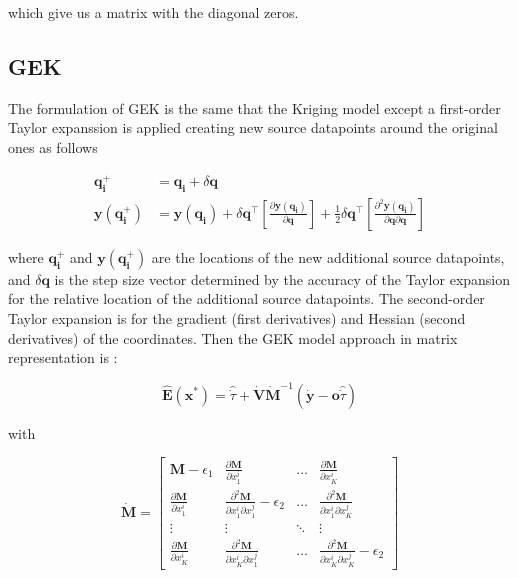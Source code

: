 \documentclass[aps,prb,twocolumn,superscriptaddress,floatfix,longbibliography,10pt]{revtex4-2}
\begin{document}
which give us a matrix with the diagonal zeros. 

\subsection{GEK}

The formulation of GEK is the same that the Kriging model except a first-order Taylor expanssion is applied creating new source datapoints around the original ones as follows\cite{Yamazaki2012}

\begin{equation} \label{eqn:xynewdata}
\begin{aligned}
\mathbf{q_i^+} &= \mathbf{q_i}+\delta\mathbf{q} \\
\mathbf{y(q_i^+)} &= \mathbf{y(q_i)}+\delta\mathbf{q}^\intercal\left[\frac{\partial \mathbf{y(q_i)}}{\partial \mathbf{q}}\right] + \frac{1}{2}\delta\mathbf{q}^\intercal\left[\frac{\partial^2 \mathbf{y(q_i)}}{\partial \mathbf{q}\partial \mathbf{q}}\right]
\end{aligned}
\end{equation}

where $\mathbf{q_i^+}$ and $\mathbf{y(q_i^+)}$ are the locations of the new additional source datapoints, and $\delta\mathbf{q}$ is the step size vector determined by the accuracy of the Taylor expansion for the relative location of the additional source datapoints. The second-order Taylor expansion is for the gradient (first derivatives) and Hessian (second derivatives) of the coordinates. Then the GEK model approach in matrix representation is :

\begin{equation} \label{eqn:GEK}
\mathbf{\hat{E}}(\mathbf{x}^*) =  \hat{\dot \tau} + \mathbf{\dot V} \mathbf{\dot M}^{-1}(\mathbf{\dot y} - \mathbf{o}\hat{\dot \tau})
\end{equation}

with 

\begin{equation} \label{eqn:dotM}
\mathbf{\dot M} = 
\begin{bmatrix}
\mathbf{M}-\epsilon_1 & \frac{\partial\mathbf{M}}{\partial x_1^i} & \dots  & \frac{\partial\mathbf{M}}{\partial x_K^i} \\
\frac{\partial\mathbf{M}}{\partial x_1^i} & \frac{\partial^2\mathbf{M}}{\partial x_1^i\partial x_1^j}-\epsilon_2 & \dots & \frac{\partial^2\mathbf{M}}{\partial x_1^i\partial x_K^j} \\
\vdots & \vdots & \ddots & \vdots \\
\frac{\partial\mathbf{M}}{\partial x_K^i} & \frac{\partial^2\mathbf{M}}{\partial x_K^i\partial x_1^j} & \dots & \frac{\partial^2\mathbf{M}}{\partial x_K^i\partial x_K^j}-\epsilon_2
\end{bmatrix}
\end{equation} 
\end{document}
